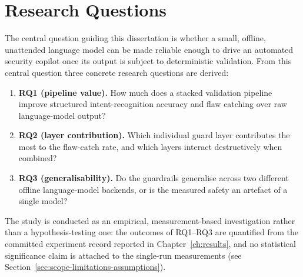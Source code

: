 \section{Research Questions}\label{sec:research-questions}

The central question guiding this dissertation is whether a small, offline,
unattended language model can be made reliable enough to drive an automated
security copilot once its output is subject to deterministic validation.
From this central question three concrete research questions are derived:

\begin{enumerate}
\item \textbf{RQ1 (pipeline value).} How much does a stacked validation
pipeline improve structured intent-recognition accuracy and flaw catching over
raw language-model output?
\item \textbf{RQ2 (layer contribution).} Which individual guard layer
contributes the most to the flaw-catch rate, and which layers interact
destructively when combined?
\item \textbf{RQ3 (generalisability).} Do the guardrails generalise across two
different offline language-model backends, or is the measured safety an
artefact of a single model?
\end{enumerate}

The study is conducted as an empirical, measurement-based investigation rather
than a hypothesis-testing one: the outcomes of RQ1--RQ3 are quantified from the
committed experiment record reported in Chapter~\ref{ch:results}, and no
statistical significance claim is attached to the single-run measurements
(see Section~\ref{sec:scope-limitations-assumptions}).